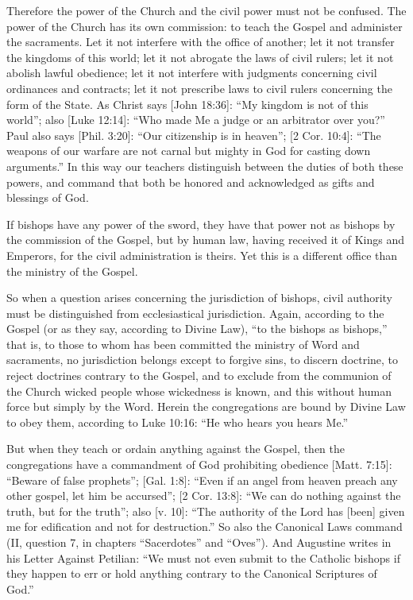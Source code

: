 Therefore the power of the Church and the civil power must not be confused. The power of the Church has its own commission: to teach the Gospel and administer the sacraments. Let it not interfere with the office of another; let it not transfer the kingdoms of this world; let it not abrogate the laws of civil rulers; let it not abolish lawful obedience; let it not interfere with judgments concerning civil ordinances and contracts; let it not prescribe laws to civil rulers concerning the form of the State. As Christ says [John 18:36]: “My kingdom is not of this world”; also [Luke 12:14]: “Who made Me a judge or an arbitrator over you?” Paul also says [Phil. 3:20]: “Our citizenship is in heaven”; [2 Cor. 10:4]: “The weapons of our warfare are not carnal but mighty in God for casting down arguments.” In this way our teachers distinguish between the duties of both these powers, and command that both be honored and acknowledged as gifts and blessings of God.

If bishops have any power of the sword, they have that power not as bishops by the commission of the Gospel, but by human law, having received it of Kings and Emperors, for the civil administration is theirs. Yet this is a different office than the ministry of the Gospel.

So when a question arises concerning the jurisdiction of bishops, civil authority must be distinguished from ecclesiastical jurisdiction. Again, according to the Gospel (or as they say, according to Divine Law), “to the bishops as bishops,” that is, to those to whom has been committed the ministry of Word and sacraments, no jurisdiction belongs except to forgive sins, to discern doctrine, to reject doctrines contrary to the Gospel, and to exclude from the communion of the Church wicked people whose wickedness is known, and this without human force but simply by the Word. Herein the congregations are bound by Divine Law to obey them, according to Luke 10:16: “He who hears you hears Me.”

But when they teach or ordain anything against the Gospel, then the congregations have a commandment of God prohibiting obedience [Matt. 7:15]: “Beware of false prophets”; [Gal. 1:8]: “Even if an angel from heaven preach any other gospel, let him be accursed”; [2 Cor. 13:8]: “We can do nothing against the truth, but for the truth”; also [v. 10]: “The authority of the Lord has [been] given me for edification and not for destruction.” So also the Canonical Laws command (II, question 7, in chapters “Sacerdotes” and “Oves”). And Augustine writes in his Letter Against Petilian: “We must not even submit to the Catholic bishops if they happen to err or hold anything contrary to the Canonical Scriptures of God.”


